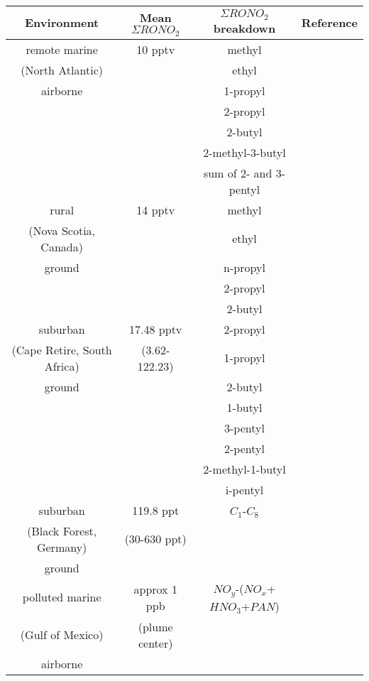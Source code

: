 \documentclass[11pt,a4paper]{article}
\begin{document}
\begin{table}\label{tab:ANmean} %
\begin{tabular}{cccc}
\hline
Environment     & Mean $\Sigma RONO_2$ & $\Sigma RONO_2$ breakdown & Reference \\
\hline
remote marine   & 10 pptv    & methyl                   & \citep{Reeves2007} \\
(North Atlantic)&            & ethyl                    & \\
airborne        &            & 1-propyl                 & \\   
                             && 2-propyl                & \\   
                             && 2-butyl                 & \\                                                                                               
                             && 2-methyl-3-butyl        & \\
                             && sum of 2- and 3-pentyl  & \\
\hline
rural           & 14 pptv    & methyl                   & \citep{Roberts1998} \\
(Nova Scotia, Canada)        && ethyl   & \\
ground                       && n-propyl & \\
                             && 2-propyl & \\
                             && 2-butyl  & \\ 
\hline
suburban                     & 17.48 pptv  & 2-propyl    & \citep{DeKock1994} \\
(Cape Retire, South Africa)  &(3.62-122.23)& 1-propyl & \\
ground                                    && 2-butyl  & \\
                                          && 1-butyl  & \\
                                          && 3-pentyl & \\
                                          && 2-pentyl & \\
                                          && 2-methyl-1-butyl & \\
                                          && i-pentyl & \\
\hline
suburban                     & 119.8 ppt  & $C_1$-$C_8$       & \citep{Flocke1998} \\
(Black Forest, Germany)      & (30-630 ppt) && \\ 
ground                                     &&& \\
\hline
polluted marine & approx 1 ppb & $NO_y$-($NO_x$+$HNO_3$+$PAN$) & \citep{Neuman2012} \\
(Gulf of Mexico)&(plume center) && \\
airborne &&& \\
\hline
\end{tabular}
\end{table}
\end{document}
